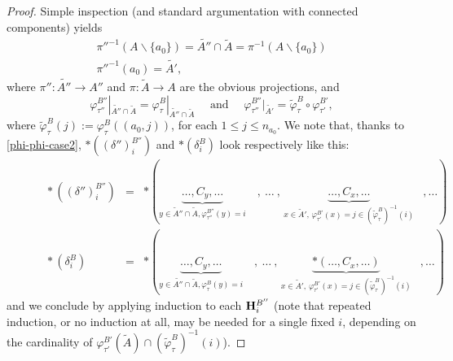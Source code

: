 \documentclass[11pt]{article}
\theoremstyle{definition}
\numberwithin{equation}{section}
\numberwithin{equation}{section}
\newcommand{\set}[1]{\{#1\}}
\newcommand{\hyper}[1]{{\bf #1}}
\newcommand{\plunderline}[1]{#1}
\begin{document}
\begin{proof}
Simple inspection (and standard argumentation with connected components) yields
$$\begin{array}{l}
\pi''^{-1}(A\backslash\set{a_0})= \widetilde{A''}\cap \tilde{A} = \pi^{-1}(A\backslash\set{a_0})\\
\pi''^{-1}(a_0) = \widetilde{A'},
\end{array}$$
where $\pi'':\widetilde{A''}\rightarrow A''$  and $\pi:\tilde{A}\rightarrow A$  are the obvious projections,
and  
\begin{equation} \label{phi-phi-case2}
\varphi^{B''}_{\tau''}|_{\widetilde{A''}\cap \tilde{A}}=\varphi_{\tau}^{\plunderline{B}}|_{\widetilde{A''}\cap \tilde{A}} \quad\mbox{ and }\quad  \varphi^{B''}_{\tau''}|_{\widetilde{A'}}=\tilde{\varphi}^{\plunderline{B}}_{\tau}\circ\varphi^{\plunderline{B'}}_{\tau'},\end{equation} 
where  
$\tilde{\varphi}_{\tau}^{\plunderline{B}}(j):={\varphi}_{\tau}^{\plunderline{B}}((a_0,j))$, for each $1\leq j\leq n_{a_{0}}$.
We  note that, thanks  to \eqref{phi-phi-case2}, $\ast((\delta'')^{B''}_{i})$ and $\ast(\delta_i^{\plunderline{B}})$ look respectively like this:
 $$\begin{array}{lll}
\quad \quad\quad \ast((\delta'')^{B''}_{i}) & = &  \ast(\underbrace{\ldots, C_y, \ldots}_{y\in \tilde{A}''\cap \tilde{A},\varphi_{\tau''}^{B''}(y)=i}\,\,\,\,\,\,,\:\ldots\:,\,\underbrace{\ldots ,C_x, \ldots}_{x\in \tilde{A}',\, \varphi^{\plunderline{B'}}_{\tau'}(x)=j\in (\tilde{\varphi}_{\tau}^{\plunderline{B}})^{-1}(i)}  \,\,\,\;,\ldots)\\
\quad\quad\quad\ast(\delta_i^{\plunderline{B}}) &=& \ast(\underbrace{\ldots, C_{y},\ldots}_{y\in \widetilde{A''}\cap \tilde{A},\varphi_{\tau}^{\plunderline{B}}(y)=i}\,\,\,\,\,\,,\:\ldots\:,\,\underbrace{\ast(\ldots, C_x, \ldots)}_{x\in \tilde{A}',\, \varphi^{\plunderline{B'}}_{\tau'}(x)=j\in (\tilde{\varphi}_{\tau}^{\plunderline{B}})^{-1}(i)}  \,\,\,\;,\ldots)
 \end{array}$$  
 and we conclude by applying   induction  to each $\hyper{H}^{B''}_i$ (note that repeated induction, or no induction at all, may be needed for a single fixed $i$, depending on the cardinality of 
 $\varphi^{\plunderline{B'}}_{\tau'}(\tilde{A})
 \cap (\tilde{\varphi}_{\tau}^{\plunderline{B}})^{-1}(i)$).


\end{proof}
\end{document}
